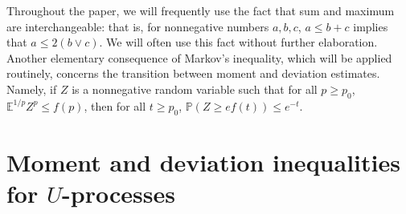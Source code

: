 \documentclass[12pt]{article}
\newcommand{\mb}{\mathbb}
\newcommand{\pr}[1]{\mathbb{P}{\left(#1\right)}}
\theoremstyle{thmstyletwo}%
\theoremstyle{thmstylethree}%
\begin{document}
Throughout the paper, we will frequently use the fact that sum and maximum are interchangeable: that is, for nonnegative numbers $a,b,c$, $a\leq b+c$ implies that $a\leq 2(b\vee c)$. We will often use this fact without further elaboration. Another elementary consequence of Markov's inequality, which will be applied routinely, concerns the transition between moment and deviation estimates. Namely, if $Z$ is a nonnegative random variable such that for all $p\geq p_0$, $\mb E^{1/p} Z^p \leq f(p)$, then for all $t\geq p_0$, $\pr{Z\geq ef(t)}\leq e^{-t}$. 

\section{Moment and deviation inequalities for $U$-processes}
\label{sec:bernstein}
\end{document}
